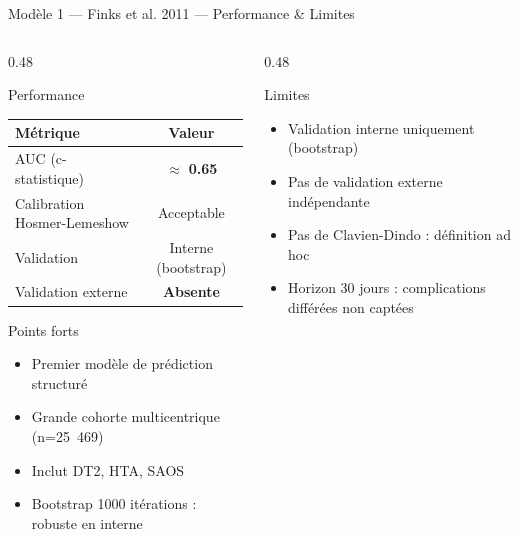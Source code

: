 \documentclass[aspectratio=169]{beamer}
\newcommand{\tightlist}{%
  \setlength{\itemsep}{1pt}\setlength{\parskip}{0pt}%
  \setlength{\parsep}{0pt}\setlength{\topsep}{2pt}}
\begin{document}
\begin{frame}[shrink=5]{Modèle 1 --- Finks et al. 2011 --- Performance \& Limites}
  \begin{columns}[T]
    \begin{column}{0.48\textwidth}
      \begin{block}{Performance}
        \footnotesize
        \begin{tabular}{lc}
          \toprule
          \textbf{Métrique} & \textbf{Valeur} \\
          \midrule
          AUC (c-statistique) & $\approx$ \textcolor{orangemod}{\textbf{0.65}} \\
          Calibration Hosmer-Lemeshow & Acceptable \\
          Validation & Interne (bootstrap) \\
          Validation externe & \textcolor{rougealerte}{\textbf{Absente}} \\
          \bottomrule
        \end{tabular}
      \end{block}
      \vspace{0.2em}
      \begin{exampleblock}{Points forts}
        \footnotesize\tightlist
        \begin{itemize}\tightlist
          \item Premier modèle de prédiction structuré
          \item Grande cohorte multicentrique (n=25~469)
          \item Inclut DT2, HTA, SAOS
          \item Bootstrap 1000 itérations : robuste en interne
        \end{itemize}
      \end{exampleblock}
    \end{column}
    \begin{column}{0.48\textwidth}
      \begin{alertblock}{Limites}
        \footnotesize\tightlist
        \begin{itemize}\tightlist
          \item Validation interne uniquement (bootstrap)
          \item Pas de validation externe indépendante
          \item Pas de Clavien-Dindo : définition ad hoc
          \item Horizon 30 jours : complications différées non captées

\end{itemize}
\end{alertblock}
\end{column}
\end{columns}
\end{frame}
\end{document}
